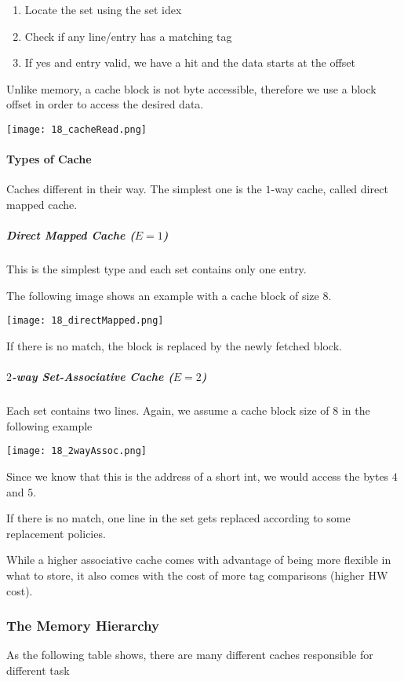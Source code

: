 \begin{enumerate}
    \item Locate the set using the set idex
    \item Check if any line/entry has a matching tag
    \item If yes and entry valid, we have a hit and the data starts at the offset
\end{enumerate}

Unlike memory, a cache block is not byte accessible, therefore we use a block offset in order to access the desired data.

\texttt{[image: 18\_cacheRead.png]}

\paragraph{Types of Cache}
Caches different in their way. The simplest one is the $1$-way cache, called direct mapped cache.

\subparagraph{Direct Mapped Cache ($E=1$)}
This is the simplest type and each set contains only one entry.

The following image shows an example with a cache block of size $8$.

\texttt{[image: 18\_directMapped.png]}

If there is no match, the block is replaced by the newly fetched block.

\subparagraph{$2$-way Set-Associative Cache ($E=2$)}
Each set contains two lines. Again, we assume a cache block size of $8$ in the following example

\texttt{[image: 18\_2wayAssoc.png]}

Since we know that this is the address of a short int, we would access the bytes $4$ and $5$.

If there is no match, one line in the set gets replaced according to some replacement policies.

While a higher associative cache comes with advantage of being more flexible in what to store, it also comes with the cost of more tag comparisons (higher HW cost).

\subsubsection{The Memory Hierarchy}
As the following table shows, there are many different caches responsible for different task

